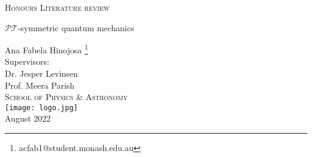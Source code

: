 \documentclass[12pt, a4paper]{report}
\begin{document}
\begin{titlepage}
\begin{center}


\vspace{1cm}
\textsc{Honours Literature review}
\vspace{2.5cm}

{\Huge \( \mathcal{PT} \)-symmetric quantum mechanics}
\vspace{3cm}

{\LARGE Ana Fabela Hinojosa \footnote{acfab1@student.monash.edu.au}} \\
\vspace{0.4cm}
{\Large Supervisors:\\ Dr. Jesper Levinsen \\ Prof. Meera Parish \\}
\textsc{School of Physics \& Astronomy} \\
\vspace{3cm}
\texttt{[image: logo.jpg]} \\ %
\vspace{3cm}
{\LARGE August 2022}\\
\vspace{0.5cm}
\end{center}
\end{titlepage}






\tableofcontents %


\end{document}

